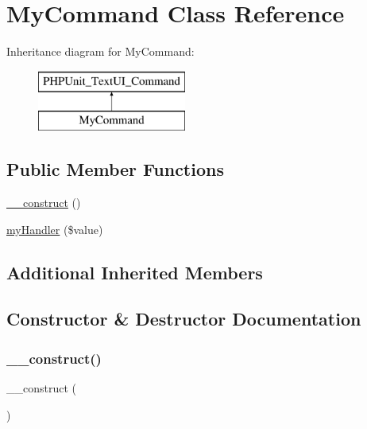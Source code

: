 \hypertarget{class_my_command}{}\section{My\+Command Class Reference}
\label{class_my_command}
Inheritance diagram for My\+Command\+:\begin{figure}[H]
\begin{center}
\leavevmode
\includegraphics[height=2.000000cm]{class_my_command}
\end{center}
\end{figure}
\subsection*{Public Member Functions}
\begin{DoxyCompactItemize}
\item 
\mbox{\hyperlink{class_my_command_a095c5d389db211932136b53f25f39685}{\+\_\+\+\_\+construct}} ()
\item 
\mbox{\hyperlink{class_my_command_a1e8f6e0626456cd0ea109f06578dc6aa}{my\+Handler}} (\$value)
\end{DoxyCompactItemize}
\subsection*{Additional Inherited Members}


\subsection{Constructor \& Destructor Documentation}
\mbox{\label{class_my_command_a095c5d389db211932136b53f25f39685}} 
\subsubsection{\texorpdfstring{\+\_\+\+\_\+construct()}{\_\_construct()}}
{\footnotesize\ttfamily \+\_\+\+\_\+construct (\begin{DoxyParamCaption}{ }\end{DoxyParamCaption})}



